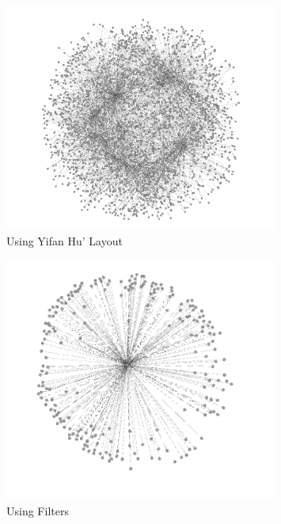 \documentclass[letterpaper,11pt]{article}
\begin{document}
\begin{figure}[!ht]
\centering
\includegraphics[width=0.8\textwidth]{Q3/2.png}
\caption{Using Yifan Hu' Layout}
\label{fig:Using Yifan Hu' Layout}
\end{figure}

\begin{figure}[!ht]
\centering
\includegraphics[width=0.8\textwidth]{Q3/4.png}
\caption{Using Filters}
\label{fig:Using Filters}
\end{figure}
\end{document}
